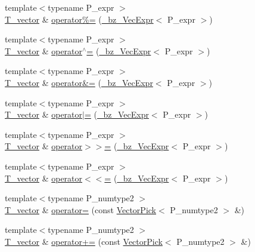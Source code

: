 \begin{DoxyCompactItemize}
{\footnotesize template$<$typename P\+\_\+expr $>$ }\\\hyperlink{classVector_a29e279edfeac4d65aad0d814c05cfaf0}{T\+\_\+vector} \& \hyperlink{classVector_a580df2212ebee66d08675ac96d0af873}{operator\%=} (\hyperlink{class__bz__VecExpr}{\+\_\+bz\+\_\+\+Vec\+Expr}$<$ P\+\_\+expr $>$)
\item 
{\footnotesize template$<$typename P\+\_\+expr $>$ }\\\hyperlink{classVector_a29e279edfeac4d65aad0d814c05cfaf0}{T\+\_\+vector} \& \hyperlink{classVector_a46c562ff6dda3dd2905847f3efbffc66}{operator$^\wedge$=} (\hyperlink{class__bz__VecExpr}{\+\_\+bz\+\_\+\+Vec\+Expr}$<$ P\+\_\+expr $>$)
\item 
{\footnotesize template$<$typename P\+\_\+expr $>$ }\\\hyperlink{classVector_a29e279edfeac4d65aad0d814c05cfaf0}{T\+\_\+vector} \& \hyperlink{classVector_a4c08bdd0cc39bee2bc9aa32ffaf1bbee}{operator\&=} (\hyperlink{class__bz__VecExpr}{\+\_\+bz\+\_\+\+Vec\+Expr}$<$ P\+\_\+expr $>$)
\item 
{\footnotesize template$<$typename P\+\_\+expr $>$ }\\\hyperlink{classVector_a29e279edfeac4d65aad0d814c05cfaf0}{T\+\_\+vector} \& \hyperlink{classVector_a7803ce0535a1798114943eecc66999d3}{operator$\vert$=} (\hyperlink{class__bz__VecExpr}{\+\_\+bz\+\_\+\+Vec\+Expr}$<$ P\+\_\+expr $>$)
\item 
{\footnotesize template$<$typename P\+\_\+expr $>$ }\\\hyperlink{classVector_a29e279edfeac4d65aad0d814c05cfaf0}{T\+\_\+vector} \& \hyperlink{classVector_a55e96105689e4f0be892fc46f8f5bc70}{operator$>$$>$=} (\hyperlink{class__bz__VecExpr}{\+\_\+bz\+\_\+\+Vec\+Expr}$<$ P\+\_\+expr $>$)
\item 
{\footnotesize template$<$typename P\+\_\+expr $>$ }\\\hyperlink{classVector_a29e279edfeac4d65aad0d814c05cfaf0}{T\+\_\+vector} \& \hyperlink{classVector_a549629f92f09e472d534ba9777afa354}{operator$<$$<$=} (\hyperlink{class__bz__VecExpr}{\+\_\+bz\+\_\+\+Vec\+Expr}$<$ P\+\_\+expr $>$)
\item 
{\footnotesize template$<$typename P\+\_\+numtype2 $>$ }\\\hyperlink{classVector_a29e279edfeac4d65aad0d814c05cfaf0}{T\+\_\+vector} \& \hyperlink{classVector_ab6a13a99607620be59fc88959a7574af}{operator=} (const \hyperlink{classVectorPick}{Vector\+Pick}$<$ P\+\_\+numtype2 $>$ \&)
\item 
{\footnotesize template$<$typename P\+\_\+numtype2 $>$ }\\\hyperlink{classVector_a29e279edfeac4d65aad0d814c05cfaf0}{T\+\_\+vector} \& \hyperlink{classVector_a876c2af66389303f21d25785a5c2f927}{operator+=} (const \hyperlink{classVectorPick}{Vector\+Pick}$<$ P\+\_\+numtype2 $>$ \&)

\end{DoxyCompactItemize}
